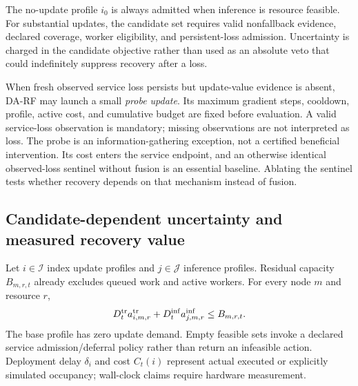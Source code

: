 The no-update profile $i_0$ is always admitted when inference is resource feasible.
For substantial updates, the candidate set requires valid nonfallback evidence,
declared coverage, worker eligibility, and persistent-loss admission. Uncertainty
is charged in the candidate objective rather than used as an absolute veto that
could indefinitely suppress recovery after a loss.

When fresh observed service loss persists but update-value evidence is absent,
DA-RF may launch a small \emph{probe update}. Its maximum gradient steps,
cooldown, profile, active cost, and cumulative budget are fixed before evaluation.
A valid service-loss observation is mandatory; missing observations are not
interpreted as loss. The probe is an information-gathering exception, not a
certified beneficial intervention. Its cost enters the service endpoint, and an
otherwise identical observed-loss sentinel without fusion is an essential
baseline. Ablating the sentinel tests whether recovery depends on that mechanism
instead of fusion.

\subsection{Candidate-dependent uncertainty and measured recovery value}

Let $i\in\mathcal I$ index update profiles and $j\in\mathcal J$ inference
profiles. Residual capacity $B_{m,r,t}$ already excludes queued work and active
workers. For every node $m$ and resource $r$,
\begin{equation}
 D_t^{\rm tr}a^{\rm tr}_{i,m,r}
 +D_t^{\rm inf}a^{\rm inf}_{j,m,r}\le B_{m,r,t}.
 \label{eq:resource-feasibility}
\end{equation}
The base profile has zero update demand. Empty feasible sets invoke a declared
service admission/deferral policy rather than return an infeasible action.
Deployment delay $\delta_i$ and cost $C_t(i)$ represent actual executed or
explicitly simulated occupancy; wall-clock claims require hardware measurement.

